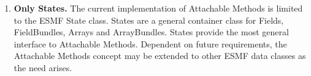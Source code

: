%


\begin{enumerate}
\item{\bf Only States.}
The current implementation of Attachable Methods is limited to the ESMF State
class. States are a general container class for Fields, FieldBundles, Arrays
and ArrayBundles. States provide the most general interface to Attachable
Methods. Dependent on future requirements, the Attachable Methods concept may
be extended to other ESMF data classes as the need arises.

\end{enumerate}



